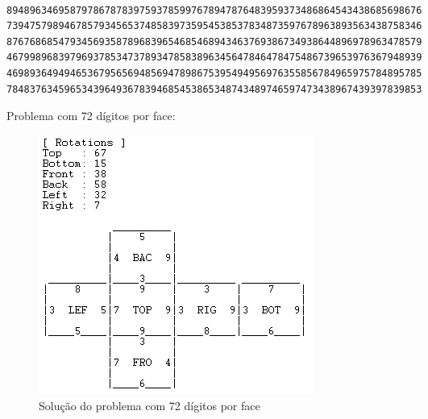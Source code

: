 \begin{f_exemplo}[H]
\begin{verbatim}

894896346958797867878397593785997678947876483959373486864543438685698676
739475798946785793456537485839735954538537834873597678963893563438758346
876768685479345693587896839654685468943463769386734938644896978963478579
467998968397969378534737893478583896345647846478475486739653976367948939
469893649494653679565694856947898675395494956976355856784965975784895785
784837634596534396493678394685453865348743489746597473438967439397839853
\end{verbatim}
\caption{Problema com 72 dígitos por face:}
\end{f_exemplo}

\begin{figure}[H]
\begin{center}
\includegraphics[scale=0.7]{ex2.png}
\caption{Solução do problema com 72 dígitos por face}
\label{fig:4}
\end{center}
\end{figure}



%
